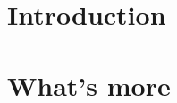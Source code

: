 \documentclass{scrreport}
\begin{document}


\newpage

\newpage

\section{Introduction}

\section{What's more}

\end{document}
